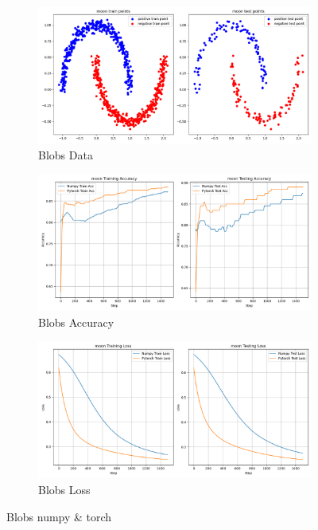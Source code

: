 \documentclass{article}
\begin{document}
\begin{figure}[!htp]
  \centering
  \begin{subfigure}[b]{0.85\textwidth}
    \includegraphics[width=\textwidth]{img/Part1/data_moon.png}
    \caption{Blobs Data}
  \end{subfigure}
  \begin{subfigure}[b]{0.9\textwidth}
    \includegraphics[width=\textwidth]{img/Part1/acc_moon.png}
    \caption{Blobs Accuracy}
  \end{subfigure}
\begin{subfigure}[b]{0.9\textwidth}
    \includegraphics[width=\textwidth]{img/Part1/loss_moon.png}
    \caption{Blobs Loss}
  \end{subfigure}
  \caption{Blobs numpy \& torch}
  \label{fig:p1t1_moon}
\end{figure}
\end{document}
